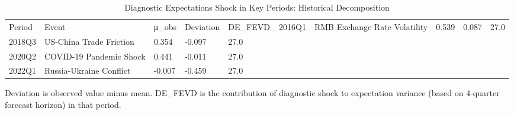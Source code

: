 \begin{table}[!htbp]
\centering
\caption{Diagnostic Expectations Shock in Key Periods: Historical Decomposition}
\label{tab:bvar_hist}
\begin{tabular}{lllll}
\toprule
Period & Event & μ_obs & Deviation & DE_FEVD_%
\midrule
2016Q1 & RMB Exchange Rate Volatility & 0.539 & 0.087 & 27.0 \\
2018Q3 & US-China Trade Friction & 0.354 & -0.097 & 27.0 \\
2020Q2 & COVID-19 Pandemic Shock & 0.441 & -0.011 & 27.0 \\
2022Q1 & Russia-Ukraine Conflict & -0.007 & -0.459 & 27.0 \\
\bottomrule
\end{tabular}

\begin{tablenotes}[flushleft]
\footnotesize
\item Deviation is observed value minus mean. DE_FEVD is the contribution of diagnostic shock to expectation variance (based on 4-quarter forecast horizon) in that period.
\end{tablenotes}
\end{table}